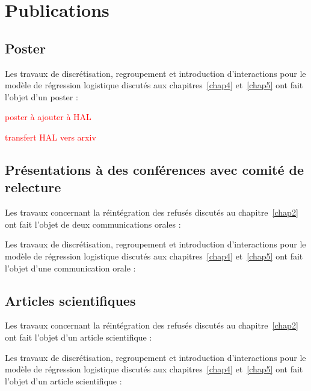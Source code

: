 \chapter{Publications}

\section{Poster}

Les travaux de discrétisation, regroupement et introduction d'interactions pour le modèle de régression logistique discutés aux chapitres~\ref{chap4} et~\ref{chap5} ont fait l'objet d'un poster :


\textcolor{red}{poster à ajouter à HAL}

\textcolor{red}{transfert HAL vers arxiv}


\section{Présentations à des conférences avec comité de relecture}

Les travaux concernant la réintégration des refusés discutés au chapitre~\ref{chap2} ont fait l'objet de deux communications orales :



Les travaux de discrétisation, regroupement et introduction d'interactions pour le modèle de régression logistique discutés aux chapitres~\ref{chap4} et~\ref{chap5} ont fait l'objet d'une communication orale :


\section{Articles scientifiques}

Les travaux concernant la réintégration des refusés discutés au chapitre~\ref{chap2} ont fait l'objet d'un article scientifique :

Les travaux de discrétisation, regroupement et introduction d'interactions pour le modèle de régression logistique discutés aux chapitres~\ref{chap4} et~\ref{chap5} ont fait l'objet d'un article scientifique :


